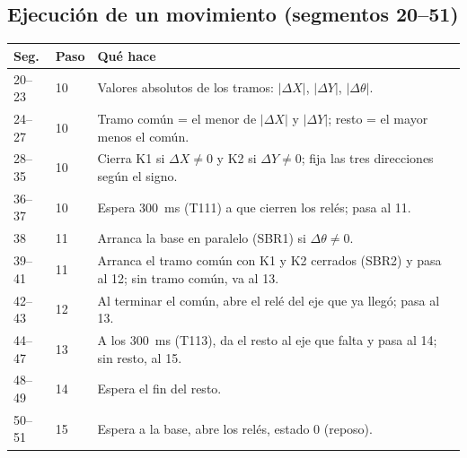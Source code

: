 \subsection{Ejecución de un movimiento (segmentos 20--51)}
\begin{center}\small
\begin{longtable}{>{\raggedright}p{1.4cm} >{\raggedright}p{1.2cm} >{\raggedright\arraybackslash}p{12.4cm}}
\toprule
\textbf{Seg.} & \textbf{Paso} & \textbf{Qué hace}\\
\midrule
\endhead
20--23 & 10 & Valores absolutos de los tramos: $|\Delta X|$, $|\Delta Y|$, $|\Delta\theta|$.\\
24--27 & 10 & Tramo común = el menor de $|\Delta X|$ y $|\Delta Y|$; resto = el mayor menos el común.\\
28--35 & 10 & Cierra K1 si $\Delta X \neq 0$ y K2 si $\Delta Y \neq 0$; fija las tres direcciones según el signo.\\
36--37 & 10 & Espera 300~ms (T111) a que cierren los relés; pasa al 11.\\
38 & 11 & Arranca la base en paralelo (SBR1) si $\Delta\theta \neq 0$.\\
39--41 & 11 & Arranca el tramo común con K1 y K2 cerrados (SBR2) y pasa al 12; sin tramo común, va al 13.\\
42--43 & 12 & Al terminar el común, abre el relé del eje que ya llegó; pasa al 13.\\
44--47 & 13 & A los 300~ms (T113), da el resto al eje que falta y pasa al 14; sin resto, al 15.\\
48--49 & 14 & Espera el fin del resto.\\
50--51 & 15 & Espera a la base, abre los relés, estado 0 (reposo).\\
\bottomrule
\end{longtable}
\end{center}

